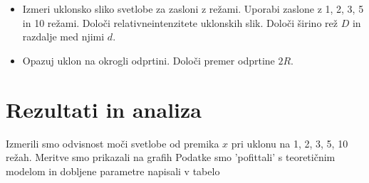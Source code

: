 \documentclass[12pt]{article}
\begin{document}
\begin{itemize}
    \item Izmeri uklonsko sliko svetlobe za zasloni z režami. Uporabi zaslone z 1, 2, 3, 5 in 10 režami. Določi relativneintenzitete uklonskih slik. Določi širino rež $D$ in razdalje med njimi $d$.
    \item Opazuj uklon na okrogli odprtini. Določi premer odprtine $2R$.
\end{itemize}
\newpage
\section{Rezultati in analiza}

Izmerili smo odvisnost moči svetlobe od premika $x$ pri uklonu na 1, 2, 3, 5, 10 režah. Meritve smo prikazali na grafih %
Podatke smo 'pofittali' s teoretičnim modelom in dobljene parametre napisali v tabelo %
\end{document}

